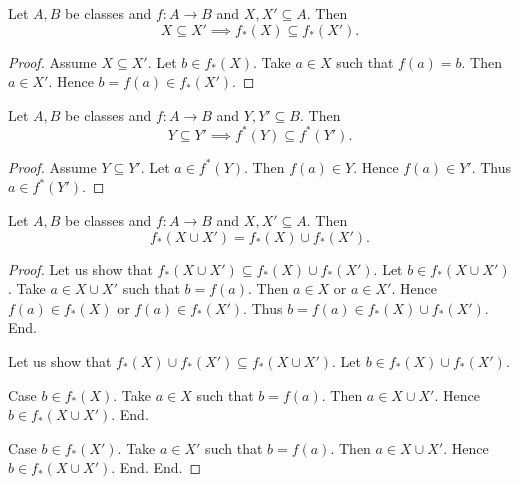 \documentclass[../../set-theory/set-theory.tex]{subfiles}
\begin{document}
  \begin{forthel}
    \begin{proposition}
      Let $A, B$ be classes and $f : A \to B$ and $X, X' \subseteq A$.
      Then \[ X \subseteq X' \implies f_{*}(X) \subseteq f_{*}(X'). \]
    \end{proposition}
    \begin{proof}
      Assume $X \subseteq X'$.
      Let $b \in f_{*}(X)$.
      Take $a \in X$ such that $f(a) = b$.
      Then $a \in X'$.
      Hence $b = f(a) \in f_{*}(X')$.
    \end{proof}
  \end{forthel}

  \begin{forthel}
    \begin{proposition}
      Let $A, B$ be classes and $f : A \to B$ and $Y, Y' \subseteq B$.
      Then \[ Y \subseteq Y' \implies f^{*}(Y) \subseteq f^{*}(Y'). \]
    \end{proposition}
    \begin{proof}
      Assume $Y \subseteq Y'$.
      Let $a \in f^{*}(Y)$.
      Then $f(a) \in Y$.
      Hence $f(a) \in Y'$.
      Thus $a \in f^{*}(Y')$.
    \end{proof}
  \end{forthel}

  \begin{forthel}
    \begin{proposition}
      Let $A, B$ be classes and $f : A \to B$ and $X, X' \subseteq A$.
      Then \[ f_{*}(X \cup X') = f_{*}(X) \cup f_{*}(X'). \]
    \end{proposition}
    \begin{proof}
      Let us show that $f_{*}(X \cup X') \subseteq f_{*}(X) \cup f_{*}(X')$.
        Let $b \in f_{*}(X \cup X')$.
        Take $a \in X \cup X'$ such that $b = f(a)$.
        Then $a \in X$ or $a \in X'$.
        Hence $f(a) \in f_{*}(X)$ or $f(a) \in f_{*}(X')$.
        Thus $b = f(a) \in f_{*}(X) \cup f_{*}(X')$.
      End.

      Let us show that $f_{*}(X) \cup f_{*}(X') \subseteq f_{*}(X \cup X')$.
        Let $b \in f_{*}(X) \cup f_{*}(X')$.

        Case $b \in f_{*}(X)$.
          Take $a \in X$ such that $b = f(a)$.
          Then $a \in X \cup X'$.
          Hence $b \in f_{*}(X \cup X')$.
        End.

        Case $b \in f_{*}(X')$.
          Take $a \in X'$ such that $b = f(a)$.
          Then $a \in X \cup X'$.
          Hence $b \in f_{*}(X \cup X')$.
        End.
      End.
    \end{proof}
  \end{forthel}
\end{document}
